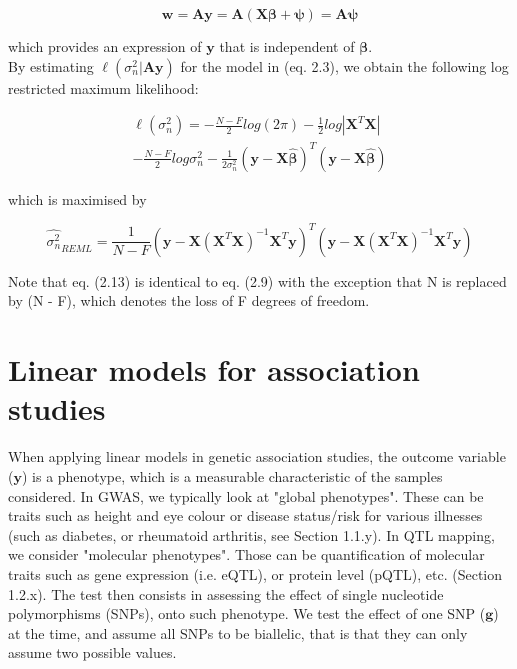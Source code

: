 \begin{equation}
    \mathbf{w} = \mathbf{A}\mathbf{y} = \mathbf{A}(\mathbf{X}\boldsymbol{\beta} + \boldsymbol{\psi}) = \mathbf{A}\boldsymbol{\psi}
\end{equation}

which provides an expression of $\mathbf{y}$ that is independent of $\boldsymbol{\beta}$.\\

By estimating $\ell(\sigma_n^2 | \mathbf{A}\mathbf{y} )$ for the model in (eq. 2.3), we obtain the following log restricted maximum likelihood:

\begin{equation} \label{eq10:Linear_regression_log_restricted_likelihood}
\begin{split}
\ell(\sigma_n^2) = -\frac{N-F}{2}log(2\pi) - \frac{1}{2}log|\mathbf{X}^T\mathbf{X}| \\
-  \frac{N-F}{2}log\sigma_n^2 - \frac{1}{2\sigma_n^2}(\mathbf{y}-\mathbf{X}\hat{\boldsymbol{\beta}})^T(\mathbf{y}-\mathbf{X}\hat{\boldsymbol{\beta}})  
\end{split}
\end{equation}

which is maximised by

\begin{equation}\label{eq11:Linear_regression_REML_sigma}
\hat{\sigma_n^2}_{REML} =  \frac{1}{N-F}(\mathbf{y}-\mathbf{X}(\mathbf{X}^T\mathbf{X})^{-1}\mathbf{X}^T\mathbf{y})^T(\mathbf{y}-\mathbf{X}(\mathbf{X}^T\mathbf{X})^{-1}\mathbf{X}^T\mathbf{y})
\end{equation}

Note that eq. (2.13) is identical to eq. (2.9) with the exception that N is replaced by (N - F), which denotes the loss of F degrees of freedom.


\section{Linear models for association studies}

When applying linear models in genetic association studies, the outcome variable ($\mathbf{y}$) is a phenotype, which is a measurable characteristic of the samples considered. 
In GWAS, we typically look at "global phenotypes".
These can be traits such as height and eye colour or disease status/risk for various illnesses (such as diabetes, or rheumatoid arthritis, see Section 1.1.y).
In QTL mapping, we consider "molecular phenotypes". 
Those can be quantification of molecular traits such as gene expression (i.e. eQTL), or protein level (pQTL), etc. (Section 1.2.x).
The test then consists in assessing the effect of single nucleotide polymorphisms (SNPs),  onto such phenotype. 
We test the effect of one SNP ($\mathbf{g}$) at the time, and assume all SNPs to be biallelic, that is that they can only assume two possible values. 

